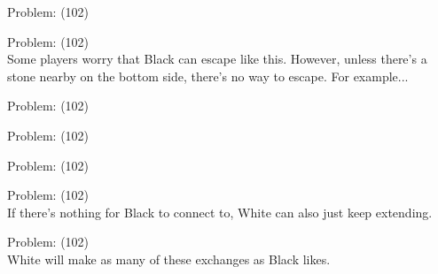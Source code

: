 \documentclass[11pt]{article}
\begin{document}
\begin{minipage}[t]{0.5\textwidth}
  {\centering
  
Problem: (102)\\
  }
\end{minipage}
\begin{minipage}[t]{0.5\textwidth}
  {\centering
  
Problem: (102)\\
Some players worry that Black can escape like this. However, unless there's a stone nearby on the bottom side, there's no way to escape. For example...\\
  }
\end{minipage}
\begin{minipage}[t]{0.5\textwidth}
  {\centering
  
Problem: (102)\\
  }
\end{minipage}
\begin{minipage}[t]{0.5\textwidth}
  {\centering
  
Problem: (102)\\
  }
\end{minipage}
\begin{minipage}[t]{0.5\textwidth}
  {\centering
  
Problem: (102)\\
  }
\end{minipage}
\begin{minipage}[t]{0.5\textwidth}
  {\centering
  
Problem: (102)\\
If there's nothing for Black to connect to, White can also just keep extending.\\
  }
\end{minipage}
\begin{minipage}[t]{0.5\textwidth}
  {\centering
  
Problem: (102)\\
White will make as many of these exchanges as Black likes.\\
  }
\end{minipage}
\end{document}
